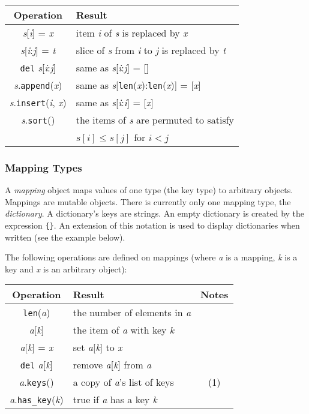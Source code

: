 \begin{center}
\begin{tabular}{|c|l|}
\hline
Operation & Result \\
\hline
{\em s}[{\em i}] = {\em x} &
	item {\em i} of {\em s} is replaced by {\em x} \\
{\em s}[{\em i}:{\em j}] = {\em t} &
	slice of {\em s} from {\em i} to {\em j} is replaced by {\em t} \\
{\tt del} {\em s}[{\em i}:{\em j}] &
	same as {\em s}[{\em i}:{\em j}] = [] \\
{\em s}.{\tt append}({\em x}) &
	same as {\em s}[{\tt len}({\em x}):{\tt len}({\em x})] = [{\em x}] \\
{\em s}.{\tt insert}({\em i}, {\em x}) &
	same as {\em s}[{\em i}:{\em i}] = [{\em x}] \\
{\em s}.{\tt sort}() &
	the items of {\em s} are permuted to satisfy \\
	&
	$s[i] \leq s[j]$ for $i < j$\\
\hline
\end{tabular}
\end{center}

\subsubsection{Mapping Types}

A
{\em mapping}
object maps values of one type (the key type) to arbitrary objects.
Mappings are mutable objects.
There is currently only one mapping type, the
{\em dictionary}.
A dictionary's keys are strings.
An empty dictionary is created by the expression \verb"{}".
An extension of this notation is used to display dictionaries when
written (see the example below).

The following operations are defined on mappings (where {\em a} is a
mapping, {\em k} is a key and {\em x} is an arbitrary object):

\begin{center}
\begin{tabular}{|c|l|c|}
\hline
Operation & Result & Notes\\
\hline
{\tt len}({\em a}) & the number of elements in {\em a} & \\
{\em a}[{\em k}] & the item of {\em a} with key {\em k} & \\
{\em a}[{\em k}] = {\em x} & set {\em a}[{\em k}] to {\em x} & \\
{\tt del} {\em a}[{\em k}] & remove {\em a}[{\em k}] from {\em a} & \\
{\em a}.{\tt keys}() & a copy of {\em a}'s list of keys & (1) \\
{\em a}.{\tt has\_key}({\em k}) & true if {\em a} has a key {\em k} & \\
\hline
\end{tabular}
\end{center}

